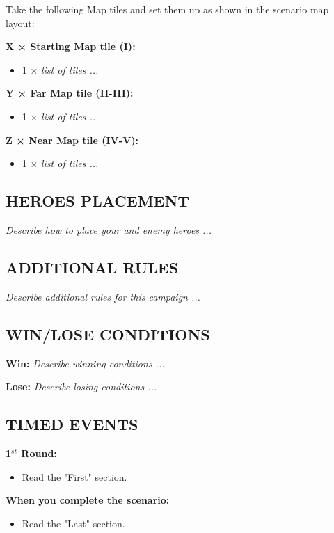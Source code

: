 \begin{multicols*}{2}
Take the following Map tiles and set them up as shown in the scenario map layout:

\textbf{X × Starting Map tile (I):}
\begin{itemize}
    \item 1 × \textit{list of tiles ...}
\end{itemize}

\textbf{Y × Far Map tile (II-III):}
\begin{itemize}
    \item 1 × \textit{list of tiles ...}
\end{itemize}

\textbf{Z × Near Map tile (IV-V):}
\begin{itemize}
    \item 1 × \textit{list of tiles ...}
\end{itemize}

\subsection*{\MakeUppercase{Heroes placement}}

\textit{Describe how to place your and enemy heroes ...}

\subsection*{\MakeUppercase{Additional rules}}

\textit{Describe additional rules for this campaign ...}

\subsection*{\MakeUppercase{Win/lose conditions}}

\textbf{Win:} \textit{Describe winning conditions ...}

\textbf{Lose:} \textit{Describe losing conditions ...}

\subsection*{\MakeUppercase{Timed events}}

\textbf{1$^{st}$ Round:}
\begin{itemize}
    \item Read the "First" section.
\end{itemize}

\textbf{When you complete the scenario:}
\begin{itemize}
    \item Read the "Last" section.
\end{itemize}


\end{multicols*}
